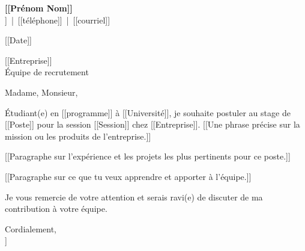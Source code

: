\documentclass[11pt,letterpaper]{article}
\begin{document}
\textbf{[[Prénom Nom]]}\\
[[Ville]] \,|\, [[téléphone]] \,|\, [[courriel]]

[[Date]]

[[Entreprise]]\\
Équipe de recrutement

Madame, Monsieur,

Étudiant(e) en [[programme]] à [[Université]], je souhaite postuler au stage de [[Poste]] pour la session [[Session]] chez [[Entreprise]]. [[Une phrase précise sur la mission ou les produits de l'entreprise.]]

[[Paragraphe sur l'expérience et les projets les plus pertinents pour ce poste.]]

[[Paragraphe sur ce que tu veux apprendre et apporter à l'équipe.]]

Je vous remercie de votre attention et serais ravi(e) de discuter de ma contribution à votre équipe.

Cordialement,\\
[[Prénom Nom]]
\end{document}

